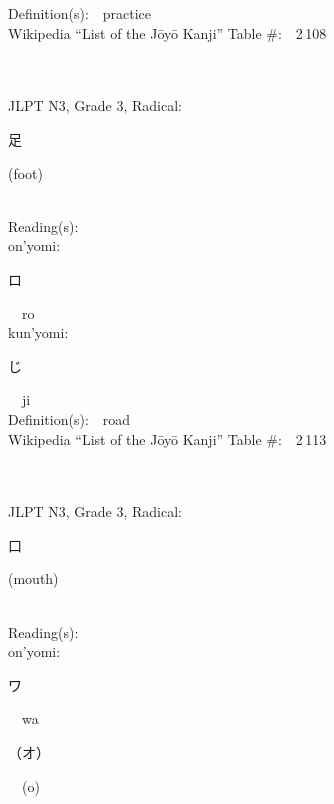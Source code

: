 \begin{multicols}{2}
Definition(s):\ \ practice \\
Wikipedia ``List of the J\=oy\=o Kanji'' Table \#:\ \ 2\,108 \\
\ \ \\
{\fontsize{34pt}{40pt}  }\ \ \\  %
{JLPT N3, Grade 3, Radical:\ \ {\begin{CJK}{UTF8}{min} 足 \end{CJK}} (foot) } \\
Reading(s):\ \ \\
{\hspace*{1em}}on'yomi:\ \ \\
{\hspace*{2em}}{\begin{CJK}{UTF8}{min} ロ \end{CJK}}\ \ ro\ \ \\
{\hspace*{1em}}kun'yomi:\ \ \\
{\hspace*{2em}}{\begin{CJK}{UTF8}{min} じ \end{CJK}}\ \ ji\ \ \\
Definition(s):\ \ road \\
Wikipedia ``List of the J\=oy\=o Kanji'' Table \#:\ \ 2\,113 \\
\ \ \\
{\fontsize{34pt}{40pt}  }\ \ \\  %
{JLPT N3, Grade 3, Radical:\ \ {\begin{CJK}{UTF8}{min} 口 \end{CJK}} (mouth) } \\
Reading(s):\ \ \\
{\hspace*{1em}}on'yomi:\ \ \\
{\hspace*{2em}}{\begin{CJK}{UTF8}{min} ワ \end{CJK}}\ \ wa\ \ \\
{\hspace*{2em}}{\begin{CJK}{UTF8}{min} （オ） \end{CJK}}\ \ (o)\ \ \\

\end{multicols}
